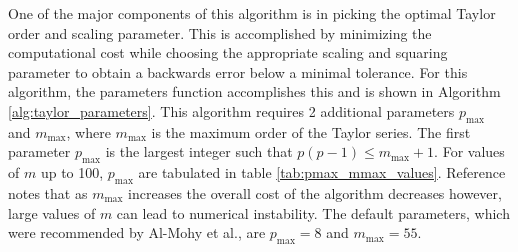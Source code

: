 One of the major components of this algorithm is in picking the optimal Taylor order and scaling parameter. This is accomplished by minimizing the computational cost while choosing the appropriate scaling and squaring parameter to obtain a backwards error below a minimal tolerance. For this algorithm, the parameters function accomplishes this and is shown in Algorithm \ref{alg:taylor_parameters}. This algorithm requires 2 additional parameters $p_{\text{max}}$ and $m_{\text{max}}$, where $m_{\text{max}}$ is the maximum order of the Taylor series. The first parameter $p_{\text{max}}$ is the largest integer such that $p(p - 1) \leq m_{\text{max}} + 1$. For values of $m$ up to 100, $p_{\text{max}}$ are tabulated in table \ref{tab:pmax_mmax_values}. Reference \cite{higham2011} notes that as $m_{\text{max}}$ increases the overall cost of the algorithm decreases however, large values of $m$ can lead to numerical instability. The default parameters, which were recommended by Al-Mohy et al., are $p_{\text{max}} = 8$ and $m_{\text{max}} = 55$.  

 